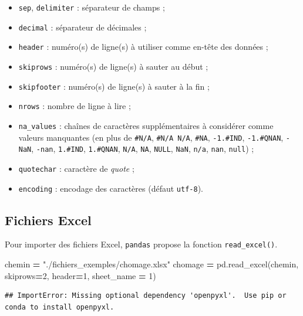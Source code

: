 \documentclass[
  12pt,
]{book}
\newenvironment{Shaded}{\begin{snugshade}}{\end{snugshade}}
\newcommand{\DecValTok}[1]{\textcolor[rgb]{0.00,0.00,0.81}{#1}}
\newcommand{\NormalTok}[1]{#1}
\newcommand{\OperatorTok}[1]{\textcolor[rgb]{0.81,0.36,0.00}{\textbf{#1}}}
\newcommand{\StringTok}[1]{\textcolor[rgb]{0.31,0.60,0.02}{#1}}
\providecommand{\tightlist}{%
  \setlength{\itemsep}{0pt}\setlength{\parskip}{0pt}}
\numberwithin{equation}{section}
\numberwithin{countremarque}{section}
\begin{document}
\begin{itemize}
\tightlist
\item
  \texttt{sep}, \texttt{delimiter} : séparateur de champs ;
\item
  \texttt{decimal} : séparateur de décimales ;
\item
  \texttt{header} : numéro(s) de ligne(s) à utiliser comme en-tête des données ;
\item
  \texttt{skiprows} : numéro(s) de ligne(s) à sauter au début ;
\item
  \texttt{skipfooter} : numéro(s) de ligne(s) à sauter à la fin ;
\item
  \texttt{nrows} : nombre de ligne à lire ;
\item
  \texttt{na\_values} : chaînes de caractères supplémentaires à considérer comme valeurs manquantes (en plus de \texttt{\#N/A}, \texttt{\#N/A\ N/A}, \texttt{\#NA}, \texttt{-1.\#IND}, \texttt{-1.\#QNAN}, \texttt{-NaN}, \texttt{-nan}, \texttt{1.\#IND}, \texttt{1.\#QNAN}, \texttt{N/A}, \texttt{NA}, \texttt{NULL}, \texttt{NaN}, \texttt{n/a}, \texttt{nan}, \texttt{null}) ;
\item
  \texttt{quotechar} : caractère de \emph{quote} ;
\item
  \texttt{encoding} : encodage des caractères (défaut \texttt{utf-8}).
\end{itemize}

\subsection{Fichiers Excel}\label{pandas-importation-excel}

Pour importer des fichiers Excel, \texttt{pandas} propose la fonction \texttt{read\_excel()}.

\begin{Shaded}
\begin{Highlighting}[]
\NormalTok{chemin }\OperatorTok{=} \StringTok{"./fichiers\_exemples/chomage.xlsx"}
\NormalTok{chomage }\OperatorTok{=}\NormalTok{ pd.read\_excel(chemin, skiprows}\OperatorTok{=}\DecValTok{2}\NormalTok{, header}\OperatorTok{=}\DecValTok{1}\NormalTok{, sheet\_name }\OperatorTok{=} \DecValTok{1}\NormalTok{)}
\end{Highlighting}
\end{Shaded}

\begin{lstlisting}
## ImportError: Missing optional dependency 'openpyxl'.  Use pip or conda to install openpyxl.
\end{lstlisting}
\end{document}
